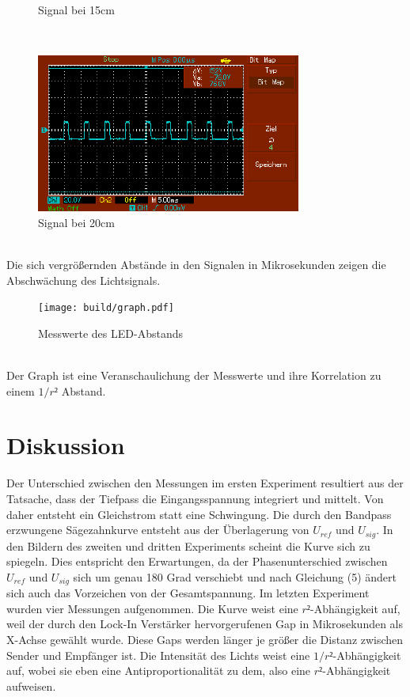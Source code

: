\documentclass[captions=tableheading]{scrartcl}
\begin{document}
\begin{itemize}
\begin{figure}
                \caption{Signal bei 15cm}
                \label{fig:15cmled}
            \end{figure}   
            \\
            \begin{figure} 
                \centering  
                \includegraphics{Lock_In Bilder/Aufgabe 4/MAP004.pdf}
                \caption{Signal bei 20cm}
                \label{fig:20cmled}    
            \end{figure}
            \\
        Die sich vergrößernden Abstände in den Signalen in Mikrosekunden zeigen die Abschwächung des Lichtsignals.
            \begin{figure}
                \centering
                \texttt{[image: build/graph.pdf]}
                \caption{Messwerte des LED-Abstands}
                \label{fig:graph}
            \end{figure}
        \\
        Der Graph ist eine Veranschaulichung der Messwerte und ihre Korrelation zu einem \(1/r²\) Abstand.
    \end{itemize}
\section{Diskussion}
Der Unterschied zwischen den Messungen im ersten Experiment resultiert aus der Tatsache, dass der Tiefpass die Eingangsspannung integriert und mittelt. Von daher entsteht ein Gleichstrom statt eine Schwingung.
Die durch den Bandpass erzwungene Sägezahnkurve entsteht aus der Überlagerung von \(U_{ref}\) und \(U_{sig}\).
In den Bildern des zweiten und dritten Experiments scheint die Kurve sich zu spiegeln. Dies entspricht den Erwartungen, da der Phasenunterschied zwischen \(U_{ref}\) und \(U_{sig}\) sich um genau 180 Grad verschiebt und nach Gleichung (5) ändert sich auch das Vorzeichen von der Gesamtspannung.
Im letzten Experiment wurden vier Messungen aufgenommen.
Die Kurve weist eine \(r²\)-Abhängigkeit auf, weil der durch den Lock-In Verstärker hervorgerufenen Gap in Mikrosekunden als X-Achse gewählt wurde. Diese Gaps werden länger je größer die Distanz zwischen Sender und Empfänger ist. Die Intensität des Lichts weist eine \(1/r²\)-Abhängigkeit auf, wobei sie eben eine Antiproportionalität zu dem, also eine \(r²\)-Abhängigkeit aufweisen.
\newpage
\end{document}
